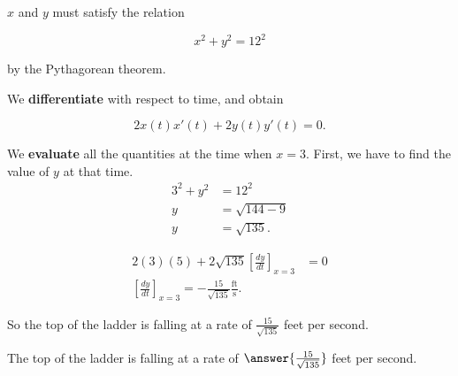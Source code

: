 \documentclass{ximera}
\begin{document}
\begin{exercise}
\begin{hint}


	$x$ and $y$ must satisfy the relation

\[
x^2 + y^2 = 12^2
\]

by the Pythagorean theorem.
\end{hint}

\begin{hint}
	We \textbf{differentiate} with respect to time, and obtain

\[
2x(t)x'(t)+2y(t)y'(t) = 0.
\]
\end{hint}

\begin{hint}
	We \textbf{evaluate} all the quantities  at the time when $x=3$. First, we have to find the value of $y$ at that time.
\begin{align*}
	3^2 +y^2 &= 12^2\\ 
	y &= \sqrt{144-9}\\
	y &= \sqrt{135}.
\end{align*}
\end{hint}

\begin{hint}
	 
\begin{align*}
2(3)(5)+2\sqrt{135}\left[\frac{dy}{dt}\right]_{x=3} &=0\\
\left[\frac{dy}{dt}\right]_{x=3} = -\frac{15}{\sqrt{135}}\frac{\textrm{ft}}{\textrm{s}}.
\end{align*}

So the top of the ladder is falling at  a rate of $\frac{15}{\sqrt{135}}$ feet per second.

\end{hint}

\begin{prompt}
	The top of the ladder is falling at a rate of $\answer{\frac{15}{\sqrt{135}}}$ feet per second.
\end{prompt}

\end{exercise}
\end{document}
